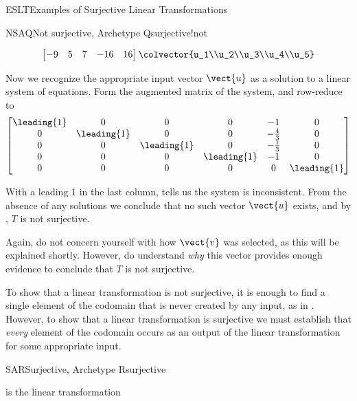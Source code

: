 \begin{subsect}{ESLT}{Examples of Surjective Linear Transformations}
\begin{example}{NSAQ}{Not surjective, Archetype Q}{surjective!not}
\begin{para}
\begin{align*}
\begin{bmatrix}
-9&5&7&-16&16
\end{bmatrix}
\colvector{u_1\\u_2\\u_3\\u_4\\u_5}
%
\end{align*}
\end{para}
%
\begin{para}Now we recognize the appropriate input vector $\vect{u}$ as a solution to a linear system of equations.  Form the augmented matrix of the system, and row-reduce to
%
\begin{equation*}
\begin{bmatrix}
\leading{1} & 0 & 0 & 0 & -1 & 0\\
0 & \leading{1} & 0 & 0 & -\frac{4}{3} & 0\\
0 & 0 & \leading{1} & 0 & -\frac{1}{3} & 0\\
0 & 0 & 0 & \leading{1} & -1 & 0\\
0 & 0 & 0 & 0 & 0 & \leading{1}\\
\end{bmatrix}
\end{equation*}
\end{para}
%
\begin{para}With a leading 1 in the last column,  tells us the system is inconsistent.  From the absence of any solutions we conclude that no such vector $\vect{u}$ exists, and by , $T$ is not surjective.\end{para}
%
\begin{para}Again, do not concern yourself with how $\vect{v}$ was selected, as this will be explained shortly.  However, do understand {\em why} this vector provides enough evidence to conclude that $T$ is not surjective.\end{para}
%
\end{example}
%
\begin{para}To show that a linear transformation is not surjective, it is enough to find a single element of the codomain that is never created by any input, as in .  However, to show that a linear transformation is surjective we must establish that {\em every} element of the codomain occurs as an output of the linear transformation for some appropriate input.\end{para}
%
\begin{example}{SAR}{Surjective, Archetype R}{surjective}
\begin{para} is the linear transformation

\end{para}
\end{example}
\end{subsect}
